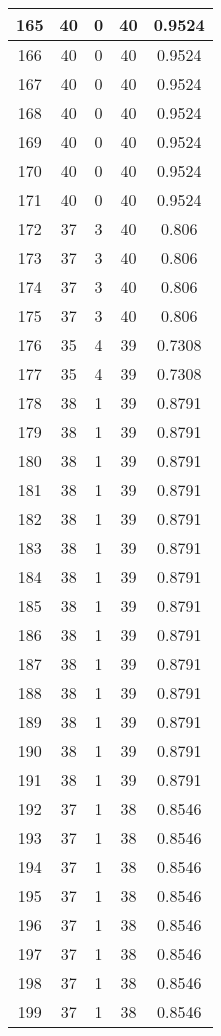 \documentclass[letterpaper, 12pt]{article}
\begin{document}
\begin{longtable}{|c|c|c|c|c|}
\hline
165 & 40 & 0 & 40 & 0.9524 \\
\hline
166 & 40 & 0 & 40 & 0.9524 \\
\hline
167 & 40 & 0 & 40 & 0.9524 \\
\hline
168 & 40 & 0 & 40 & 0.9524 \\
\hline
169 & 40 & 0 & 40 & 0.9524 \\
\hline
170 & 40 & 0 & 40 & 0.9524 \\
\hline
171 & 40 & 0 & 40 & 0.9524 \\
\hline
172 & 37 & 3 & 40 & 0.806 \\
\hline
173 & 37 & 3 & 40 & 0.806 \\
\hline
174 & 37 & 3 & 40 & 0.806 \\
\hline
175 & 37 & 3 & 40 & 0.806 \\
\hline
176 & 35 & 4 & 39 & 0.7308 \\
\hline
177 & 35 & 4 & 39 & 0.7308 \\
\hline
178 & 38 & 1 & 39 & 0.8791 \\
\hline
179 & 38 & 1 & 39 & 0.8791 \\
\hline
180 & 38 & 1 & 39 & 0.8791 \\
\hline
181 & 38 & 1 & 39 & 0.8791 \\
\hline
182 & 38 & 1 & 39 & 0.8791 \\
\hline
183 & 38 & 1 & 39 & 0.8791 \\
\hline
184 & 38 & 1 & 39 & 0.8791 \\
\hline
185 & 38 & 1 & 39 & 0.8791 \\
\hline
186 & 38 & 1 & 39 & 0.8791 \\
\hline
187 & 38 & 1 & 39 & 0.8791 \\
\hline
188 & 38 & 1 & 39 & 0.8791 \\
\hline
189 & 38 & 1 & 39 & 0.8791 \\
\hline
190 & 38 & 1 & 39 & 0.8791 \\
\hline
191 & 38 & 1 & 39 & 0.8791 \\
\hline
192 & 37 & 1 & 38 & 0.8546 \\
\hline
193 & 37 & 1 & 38 & 0.8546 \\
\hline
194 & 37 & 1 & 38 & 0.8546 \\
\hline
195 & 37 & 1 & 38 & 0.8546 \\
\hline
196 & 37 & 1 & 38 & 0.8546 \\
\hline
197 & 37 & 1 & 38 & 0.8546 \\
\hline
198 & 37 & 1 & 38 & 0.8546 \\
\hline
199 & 37 & 1 & 38 & 0.8546 \\
\hline
\end{longtable}
\end{document}
